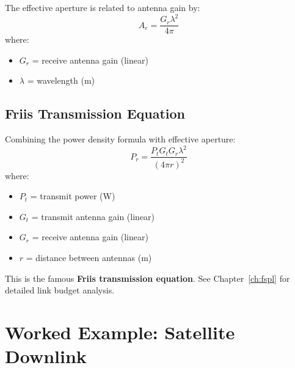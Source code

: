 The effective aperture is related to antenna gain by:
\begin{equation}
A_e = \frac{G_r \lambda^2}{4\pi}
\label{eq:effective-aperture}
\end{equation}
where:
\begin{itemize}
\item $G_r$ = receive antenna gain (linear)
\item $\lambda$ = wavelength (m)
\end{itemize}

\subsection{Friis Transmission Equation}

Combining the power density formula with effective aperture:
\begin{equation}
P_r = \frac{P_t G_t G_r \lambda^2}{(4\pi r)^2}
\label{eq:friis-equation}
\end{equation}
where:
\begin{itemize}
\item $P_t$ = transmit power (W)
\item $G_t$ = transmit antenna gain (linear)
\item $G_r$ = receive antenna gain (linear)
\item $r$ = distance between antennas (m)
\end{itemize}

This is the famous \textbf{Friis transmission equation}. See Chapter~\ref{ch:fspl} for detailed link budget analysis.

\section{Worked Example: Satellite Downlink}

